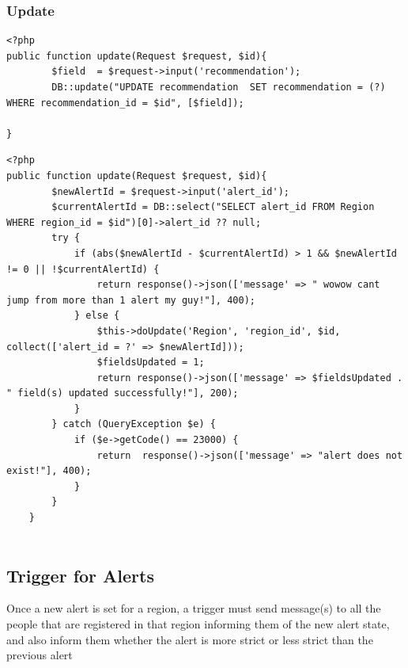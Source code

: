 \subsubsection{Update}
\begin{verbatim}
<?php
public function update(Request $request, $id){
        $field  = $request->input('recommendation');
        DB::update("UPDATE recommendation  SET recommendation = (?) WHERE recommendation_id = $id", [$field]);

}
\end{verbatim}
\begin{verbatim}
<?php
public function update(Request $request, $id){
        $newAlertId = $request->input('alert_id');
        $currentAlertId = DB::select("SELECT alert_id FROM Region WHERE region_id = $id")[0]->alert_id ?? null;
        try {
            if (abs($newAlertId - $currentAlertId) > 1 && $newAlertId != 0 || !$currentAlertId) {
                return response()->json(['message' => " wowow cant jump from more than 1 alert my guy!"], 400);
            } else {
                $this->doUpdate('Region', 'region_id', $id, collect(['alert_id = ?' => $newAlertId]));
                $fieldsUpdated = 1;
                return response()->json(['message' => $fieldsUpdated . " field(s) updated successfully!"], 200);
            }
        } catch (QueryException $e) {
            if ($e->getCode() == 23000) {
                return  response()->json(['message' => "alert does not exist!"], 400);
            }
        }
    }
    
\end{verbatim}

\subsection{Trigger for Alerts}
Once a new alert is set for a region, a trigger must send message(s) to all the people that
are registered in that region informing them of the new alert state, and also inform them
whether the alert is more strict or less strict than the previous alert
